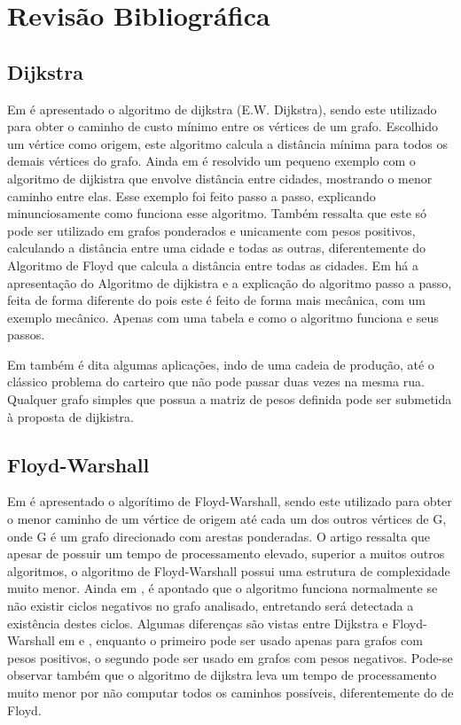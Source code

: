 \chapter{Revisão Bibliográfica}
	 
\section{Dijkstra}
	 
 Em \cite{de2008algoritmo} é apresentado o algoritmo de dijkstra (E.W. Dijkstra), sendo este utilizado para obter o caminho de custo mínimo entre os vértices de um grafo. Escolhido um vértice como origem, este algoritmo calcula a distância mínima para todos os demais vértices do grafo.   
 Ainda em \cite{de2008algoritmo} é resolvido um pequeno exemplo com o algoritmo de dijkistra que envolve distância entre cidades, mostrando o menor caminho entre elas. Esse exemplo foi feito passo a passo, explicando minunciosamente como funciona esse algoritmo. Também ressalta que este só pode ser utilizado em grafos ponderados e unicamente com pesos positivos, calculando a distância entre uma cidade e todas as outras, diferentemente do Algoritmo de Floyd que calcula a distância entre todas as cidades.   
Em \cite{barros2007algoritmo} há a apresentação do Algoritmo de dijkistra e a explicação do algoritmo passo a passo, feita de forma diferente do \cite{algo} pois este é feito de forma mais mecânica, com um exemplo mecânico. Apenas com uma tabela e como o algoritmo funciona e seus passos.
	   
Em \cite{barros2007algoritmo} também é dita algumas aplicações, indo de uma cadeia de produção, até o clássico problema do carteiro que não pode passar duas vezes na mesma rua. Qualquer grafo simples que possua a matriz de pesos definida pode ser submetida à proposta de dijkistra.
	   
\section{Floyd-Warshall} 
 Em \cite{hougard2010floyd} é apresentado o algorítimo de Floyd-Warshall, sendo este utilizado para obter o menor caminho de um vértice de origem até cada um dos outros vértices de  G, onde G é um grafo direcionado com arestas ponderadas. O artigo ressalta que apesar de possuir um tempo de processamento elevado, superior a muitos outros algoritmos, o algoritmo de Floyd-Warshall possui uma estrutura de complexidade muito menor.
 Ainda em \cite{hougard2010floyd}, é apontado que o algoritmo funciona normalmente se não existir ciclos negativos no grafo analisado, entretando será detectada a existência destes ciclos. 
 Algumas diferenças são vistas entre Dijkstra e Floyd-Warshall em \cite{barros2007algoritmo} e \cite{hougard2010floyd}, enquanto o primeiro pode ser usado apenas para grafos com pesos positivos, o segundo pode ser usado em grafos com pesos negativos. Pode-se observar também que o algoritmo de dijkstra leva um tempo de processamento muito menor por não computar todos os caminhos possíveis, diferentemente do de Floyd. 
